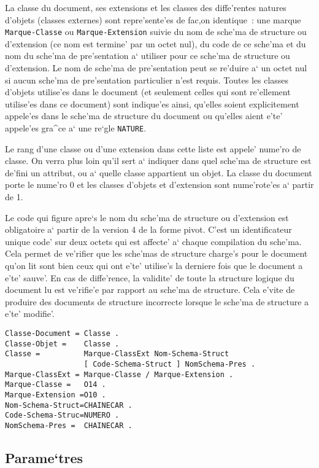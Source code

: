 La classe du document, ses extensions et les classes des diffe'rentes natures
d'objets (classes externes) sont repre'sente'es de fac,on identique~: une
marque {\tt Marque-Classe} ou {\tt Marque-Extension} suivie du nom de sche'ma
de structure ou d'extension (ce nom est termine' par un octet nul), du code
de ce sche'ma et du nom du sche'ma de pre'sentation
a` utiliser pour ce sche'ma de structure ou d'extension. Le nom de sche'ma de
pre'sentation peut se re'duire a` un octet nul si aucun sche'ma de
pre'sentation particulier n'est requis.
Toutes les classes d'objets utilise'es dans le document
(et seulement celles qui sont re'ellement utilise'es dans ce document) sont
indique'es ainsi, qu'elles soient explicitement appele'es dans le sche'ma
de structure du document ou qu'elles aient e'te' appele'es gra^ce a` une
re`gle {\tt NATURE}.

Le rang d'une classe ou d'une extension dans cette liste est appele'
nume'ro de classe. On verra plus loin qu'il sert a` indiquer dans quel sche'ma
de structure est de'fini un attribut, ou a` quelle classe appartient un objet.
La classe du document porte le nume'ro 0 et les classes d'objets et d'extension
sont nume'rote'es a` partir de 1.

Le code qui figure apre`s le nom du sche'ma de structure ou d'extension est
obligatoire a` partir de la version 4 de la forme pivot. C'est un
identificateur unique code' sur deux octets qui est affecte' a` chaque
compilation du sche'ma.
Cela permet de ve'rifier que les sche'mas de structure charge's pour le
document qu'on lit sont bien ceux qui ont e'te' utilise's la derniere fois
que le document a e'te' sauve'. En cas de diffe'rence, la validite' de toute
la structure logique du document lu est ve'rifie'e par rapport au sche'ma
de structure. Cela e'vite de produire des documents de structure incorrecte
lorsque le sche'ma de structure a e'te' modifie'.

\begin{verbatim}
Classe-Document = Classe .
Classe-Objet =    Classe .
Classe =          Marque-ClassExt Nom-Schema-Struct
                  [ Code-Schema-Struct ] NomSchema-Pres .
Marque-ClassExt = Marque-Classe / Marque-Extension .
Marque-Classe =   O14 .
Marque-Extension =O10 .
Nom-Schema-Struct=CHAINECAR .
Code-Schema-Struc=NUMERO .
NomSchema-Pres =  CHAINECAR .
\end{verbatim}

\subsection{Parame`tres}

